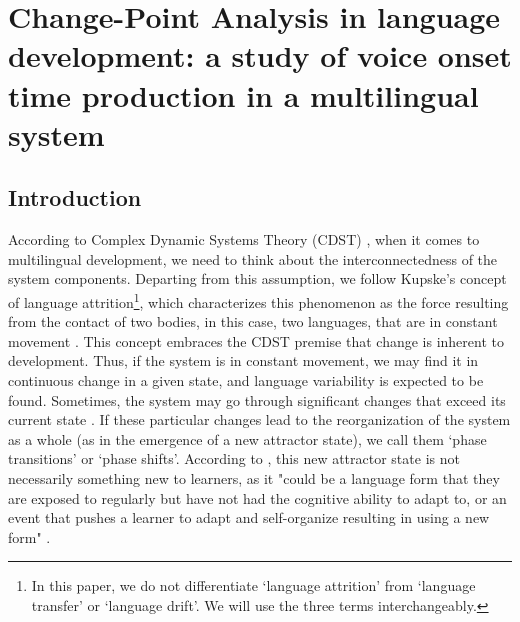\chapter{Change-Point Analysis in language development: a study of voice onset time production in a multilingual system}\label{ch:adrielledecar3}
\begin{affils}
\end{affils}

\section{Introduction}


According to Complex Dynamic Systems Theory (CDST) \citep{larsen-freeman2008,lowie2015,lowie2019},
when it comes to
multilingual development, we need to think about the interconnectedness of the
system components. Departing from this assumption, we follow Kupske's concept
of language attrition\footnote{In this paper, we do not differentiate ‘language
attrition’ from ‘language transfer’ or ‘language drift’. We will use the three
terms interchangeably.}, which characterizes this phenomenon as the force
resulting from the contact of two bodies, in this case, two languages, that are
in constant movement \citep[p.~39--40]{kupske2016}. This concept embraces the
CDST premise that change is inherent to development. Thus, if the system is in
constant movement, we may find it in continuous change in a given state, and
language variability is expected to be found. Sometimes, the system may go
through significant changes that exceed its current state \citep{van_dijk2007}.
If these particular changes lead to the reorganization of the
system as a whole (as in the emergence of a new attractor state), we call them
‘phase transitions’ or ‘phase shifts’. According to \citet{hepford2020}, this new
attractor state is not necessarily something new to learners, as it "could be a
language form that they are exposed to regularly but have not had the cognitive
ability to adapt to, or an event that pushes a learner to adapt and
self-organize resulting in using a new form" \citep[p.~162--163]{hepford2020}.

